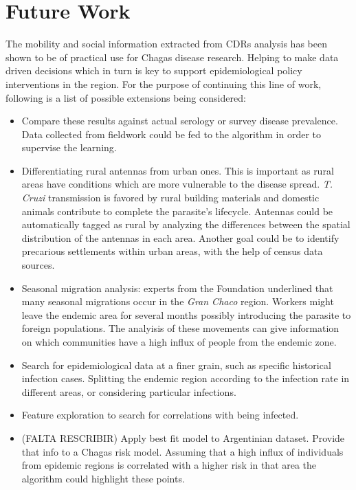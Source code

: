 \section{Future Work}

The mobility and social information extracted from CDRs analysis has been shown to be of practical use for Chagas disease research. Helping to make data driven decisions which in turn is key to support epidemiological policy interventions in the region. For the purpose of continuing this line of work, following is a list of possible extensions being considered:

\begin{itemize}
    \item Compare these results against actual serology or survey disease prevalence. Data collected from fieldwork could be fed to the algorithm in order to supervise the learning. 
    \item Differentiating rural antennas from urban ones. This is important as rural areas have conditions which are more vulnerable to the disease spread. \textit{T. Cruzi} transmission is favored by rural building materials and domestic animals contribute to complete the parasite's lifecycle. Antennas could be automatically tagged as rural by analyzing the differences between the spatial distribution of the antennas in each area. Another goal could be to identify precarious settlements within urban areas, with the help of census data sources.
    \item Seasonal migration analysis:  experts from the Foundation underlined that many seasonal migrations occur in the \textit{Gran Chaco} region.  Workers might leave the endemic area for several months possibly introducing the parasite to foreign populations. The analyisis of these movements can give information on which communities have a high influx of people from the endemic zone.
    \item Search for epidemiological data at a finer grain, such as specific historical infection cases. Splitting the endemic region according to the infection rate in different areas, or considering particular infections.
    \item Feature exploration to search for correlations with being infected.
    \item (FALTA RESCRIBIR) Apply best fit model to Argentinian dataset. Provide that info to a Chagas risk model. Assuming that a high influx of individuals from epidemic regions is correlated with a higher risk in that area the algorithm could highlight these points. %
\end{itemize}

